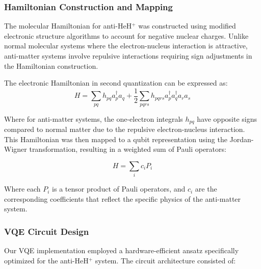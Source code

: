 \documentclass[10pt,twocolumn,a4paper]{article}
\begin{document}
\subsubsection{Hamiltonian Construction and Mapping}
The molecular Hamiltonian for anti-HeH$^+$ was constructed using modified electronic structure algorithms to account for negative nuclear charges. Unlike normal molecular systems where the electron-nucleus interaction is attractive, anti-matter systems involve repulsive interactions requiring sign adjustments in the Hamiltonian construction.

The electronic Hamiltonian in second quantization can be expressed as:
\begin{equation}
    H = \sum_{pq} h_{pq} a_p^\dagger a_q + \frac{1}{2}\sum_{pqrs} h_{pqrs} a_p^\dagger a_q^\dagger a_r a_s
\end{equation}

Where for anti-matter systems, the one-electron integrals $h_{pq}$ have opposite signs compared to normal matter due to the repulsive electron-nucleus interaction. This Hamiltonian was then mapped to a qubit representation using the Jordan-Wigner transformation, resulting in a weighted sum of Pauli operators:

\begin{equation}
    H = \sum_i c_i P_i
\end{equation}

Where each $P_i$ is a tensor product of Pauli operators, and $c_i$ are the corresponding coefficients that reflect the specific physics of the anti-matter system.

\subsubsection{VQE Circuit Design}
Our VQE implementation employed a hardware-efficient ansatz specifically optimized for the anti-HeH$^+$ system. The circuit architecture consisted of:
\end{document}
